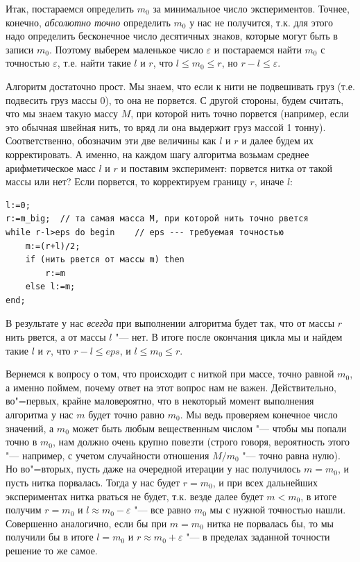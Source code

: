\documentclass[a4paper,10pt]{problems}
\let\eps\varepsilon
\begin{document}
Итак, постараемся определить $m_0$ за минимальное число экспериментов. 
Точнее, конечно, \textit{абсолютно точно} определить $m_0$ у нас не получится, т.к. для этого надо определить бесконечное число десятичных знаков, 
которые могут быть в записи $m_0$. 
Поэтому выберем маленькое число $\eps$ и постараемся найти $m_0$ с точностью $\eps$, 
т.е. найти такие $l$ и $r$, что $l\leq m_0\leq r$, но $r-l\leq \eps$.

Алгоритм достаточно прост. Мы знаем, что если к нити не подвешивать груз (т.е. подвесить груз массы $0$), то она не порвется. 
С другой стороны, будем считать, что мы знаем такую массу $M$, при которой нить точно порвется 
(например, если это обычная швейная нить, то вряд ли она выдержит груз массой 1 тонну).
Соответственно, обозначим эти две величины как $l$ и $r$ и далее будем их корректировать. 
А именно, на каждом шагу алгоритма возьмам среднее арифметическое масс $l$ и $r$ и поставим эксперимент: порвется нитка от такой массы или нет? 
Если порвется, то корректируем границу $r$, иначе $l$:
\begin{codesampleo}\begin{verbatim}
l:=0;
r:=m_big;  // та самая масса M, при которой нить точно рвется
while r-l>eps do begin    // eps --- требуемая точностью
    m:=(r+l)/2;
    if (нить рвется от массы m) then
        r:=m
    else l:=m;
end;
\end{verbatim}
\end{codesampleo}

В результате у нас \textit{всегда} при выполнении алгоритма будет так, что от массы $r$ нить рвется, а от массы $l$ "--- нет. 
В итоге после окончания цикла мы и найдем такие $l$ и $r$, что $r-l\leq eps$, и $l\leq m_0\leq r$.

Вернемся к вопросу о том, что происходит с ниткой при массе, точно равной $m_0$, а именно поймем, почему ответ на этот вопрос нам не важен.
Действительно, во"=первых, крайне маловероятно, что в некоторый момент выполнения алгоритма у нас $m$ будет точно равно $m_0$.
Мы ведь проверяем конечное число значений, а $m_0$ может быть любым вещественным числом "--- чтобы мы попали точно в $m_0$,
нам должно очень крупно повезти (строго говоря, вероятность этого "--- например, с учетом случайности отношения $M/m_0$ "--- точно равна нулю).
Но во"=вторых, пусть даже на очередной итерации у нас получилось $m=m_0$, и пусть нитка порвалась. 
Тогда у нас будет $r=m_0$, и при всех дальнейших экспериментах нитка рваться не будет, т.к. везде далее будет $m<m_0$,
в итоге получим $r=m_0$ и $l\approx m_0-\eps$ "--- все равно $m_0$ мы с нужной точностью нашли. 
Совершенно аналогично, если бы при $m=m_0$ нитка не порвалась бы, то мы получили бы в итоге $l=m_0$ и $r\approx m_0+\eps$ 
"--- в пределах заданной точности решение то же самое.
\end{document}
